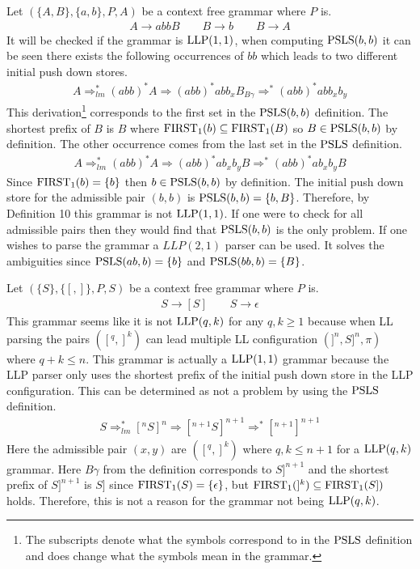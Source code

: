 \begin{example}
    \label{ex:llp21}
    Let $(\{A, B\}, \{a, b\}, P, A)$ be a context free grammar where $P$ is.
    \begin{gather*}
        A \to a b b B \qquad B \to b \qquad B \to A
    \end{gather*}
    It will be checked if the grammar is $\text{LLP}(1, 1)$, when computing $\text{PSLS}(b,b)$ it can be seen there exists the following occurrences of $bb$ which leads to two different initial push down stores.
    \begin{align*}
        A \Rightarrow_{lm}^* (abb)^*A \Rightarrow (abb)^*abb_xB_{B\gamma} \Rightarrow^* (abb)^*abb_xb_y
    \end{align*}
    This derivation\footnote{The subscripts denote what the symbols correspond to in the $\text{PSLS}$ definition and does change what the symbols mean in the grammar.} corresponds to the first set in the $\text{PSLS}(b, b)$ definition. The shortest prefix of $B$ is $B$ where $\text{FIRST}_1(b) \subseteq \text{FIRST}_1(B)$ so $B \in \text{PSLS}(b,b)$ \cite[2]{errata:Vagner2007} by definition. The other occurrence comes from the last set in the $\text{PSLS}$ definition.
    \begin{align*}
        A \Rightarrow_{lm}^* (abb)^*A \Rightarrow (abb)^*ab_xb_yB \Rightarrow^* (abb)^*ab_xb_yB
    \end{align*}
    Since $\text{FIRST}_1(b) = \{b\}$ then $b \in \text{PSLS}(b, b)$ by definition. The initial push down store for the admissible pair $(b, b)$ is $\text{PSLS}(b, b) = \{b, B\}$. Therefore, by Definition 10 \cite[13]{Vagner2007} this grammar is not $\text{LLP}(1, 1)$. If one were to check for all admissible pairs then they would find that $\text{PSLS}(b,b)$ is the only problem. If one wishes to parse the grammar a $LLP(2, 1)$ parser can be used. It solves the ambiguities since $\text{PSLS}(ab, b) = \{b\}$ and $\text{PSLS}(bb, b) = \{B\}$.
\end{example}

\begin{example}
    Let $(\{S\}, \{[, ]\}, P, S)$ be a context free grammar where $P$ is.
    \begin{gather*}
        S \to [S] \qquad S \to \epsilon
    \end{gather*}
    This grammar seems like it is not $\text{LLP}(q, k)$ for any $q, k \geq 1$ because when LL parsing the pairs $([^q, ]^k)$ can lead multiple LL configuration $(]^n, S]^n, \pi)$ where $q + k \leq n$. This grammar is actually a $\text{LLP}(1,1)$ grammar because the LLP parser only uses the shortest prefix of the initial push down store in the LLP configuration. This can be determined as not a problem by using the $\text{PSLS}$ definition.
    \begin{align*}
        S \Rightarrow_{lm}^* [^nS]^n \Rightarrow [^{n + 1}S]^{n + 1} \Rightarrow^* [^{n + 1}]^{n + 1}
    \end{align*}
    Here the admissible pair $(x, y)$ are $([^q, ]^k)$ where $q, k \leq n + 1$ for a $\text{LLP}(q, k)$ grammar. Here $B\gamma$ from the definition corresponds to $S]^{n+1}$ and the shortest prefix of $S]^{n+1}$ is $S]$ since $\text{FIRST}_1(S) = \{\epsilon\}$, but $\text{FIRST}_1(]^k) \subseteq \text{FIRST}_1(S])$ holds. Therefore, this is not a reason for the grammar not being $\text{LLP}(q,k)$.
\end{example}

